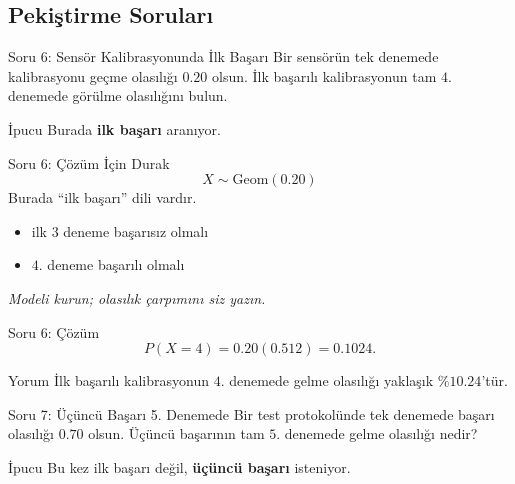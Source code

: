 \documentclass[light]{lutbeamer}
\begin{document}
\subsection{Pekiştirme Soruları}

\begin{frame}{Soru 6: Sensör Kalibrasyonunda İlk Başarı}
    \small
    Bir sensörün tek denemede kalibrasyonu geçme olasılığı \(0.20\) olsun. İlk başarılı kalibrasyonun tam \(4\). denemede görülme olasılığını bulun.

    \begin{block}{İpucu}
        Burada \textbf{ilk başarı} aranıyor.
    \end{block}
\end{frame}

\begin{frame}{Soru 6: Çözüm İçin Durak}
    \color{red!70!black}
    \small
    \[
    X \sim \text{Geom}(0.20)
    \]
    Burada ``ilk başarı'' dili vardır.
    \begin{itemize}
        \item ilk \(3\) deneme başarısız olmalı
        \item \(4\). deneme başarılı olmalı
    \end{itemize}

    \begin{center}
        \textit{Modeli kurun; olasılık çarpımını siz yazın.}
    \end{center}
\end{frame}

\begin{frame}{Soru 6: Çözüm}
    \small
    \[
    P(X=4)=0.20(0.512)=0.1024.
    \]

    \begin{exampleblock}{Yorum}
        İlk başarılı kalibrasyonun \(4\). denemede gelme olasılığı yaklaşık \(\%10.24\)'tür.
    \end{exampleblock}
\end{frame}

\begin{frame}{Soru 7: Üçüncü Başarı 5. Denemede}
    \small
    Bir test protokolünde tek denemede başarı olasılığı \(0.70\) olsun. Üçüncü başarının tam \(5\). denemede gelme olasılığı nedir?

    \begin{block}{İpucu}
        Bu kez ilk başarı değil, \textbf{üçüncü başarı} isteniyor.
    \end{block}
\end{frame}
\end{document}
